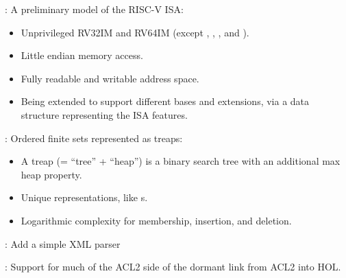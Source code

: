 
\begin{frame}

\newlibtitle

:
A preliminary model of the RISC-V ISA:
\begin{itemize}
\item Unprivileged RV32IM and RV64IM
      (except , , , and ).
\item Little endian memory access.
\item Fully readable and writable address space.
\item Being extended to support different bases and extensions,
      via a data structure representing the ISA features.
\end{itemize}

\end{frame}


\begin{frame}

\newlibtitle

:
Ordered finite sets represented as treaps:
\begin{itemize}
\item A treap (= ``tree'' + ``heap'') is a binary search tree with an
      additional max heap property.
\item Unique representations, like s.
\item Logarithmic complexity for membership, insertion, and deletion.
\end{itemize}

\end{frame}


\begin{frame}

\newlibtitle

: Add a simple XML parser

\end{frame}


\begin{frame}

\newlibtitle

:
Support for much of the ACL2 side of the dormant link from ACL2 into HOL.

\end{frame}

